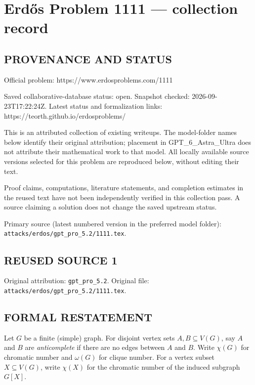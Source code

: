\section*{Erd\H{o}s Problem 1111 --- collection record}

\subsection*{PROVENANCE AND STATUS}
Official problem: https://www.erdosproblems.com/1111

Saved collaborative-database status: open.
Snapshot checked: 2026-09-23T17:22:24Z.
Latest status and formalization links: https://teorth.github.io/erdosproblems/

This is an attributed collection of existing writeups. The model-folder names below identify their original attribution; placement in GPT\_6\_Astra\_Ultra does not attribute their mathematical work to that model. All locally available source versions selected for this problem are reproduced below, without editing their text.

Proof claims, computations, literature statements, and completion estimates in the reused text have not been independently verified in this collection pass. A source claiming a solution does not change the saved upstream status.

Primary source (latest numbered version in the preferred model folder): \texttt{attacks/erdos/gpt\_pro\_5.2/1111.tex}.

\subsection*{REUSED SOURCE 1}
Original attribution: \texttt{gpt\_pro\_5.2}.
Original file: \texttt{attacks/erdos/gpt\_pro\_5.2/1111.tex}.


\subsection*{FORMAL RESTATEMENT}
Let $G$ be a finite (simple) graph.
For disjoint vertex sets $A,B\subseteq V(G)$, say $A$ and $B$ are \emph{anticomplete} if there are no edges between $A$ and $B$.
Write $\chi(G)$ for chromatic number and $\omega(G)$ for clique number.
For a vertex subset $X\subseteq V(G)$, write $\chi(X)$ for the chromatic number of the induced subgraph $G[X]$.

